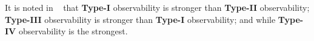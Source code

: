 It is noted in ~\cite{Zhang2016Observability} that {\bf Type-I} observability is stronger than {\bf Type-II} observability; {\bf Type-III} observability is stronger than {\bf Type-I} observability;  and while {\bf Type-IV} observability is the strongest. 





